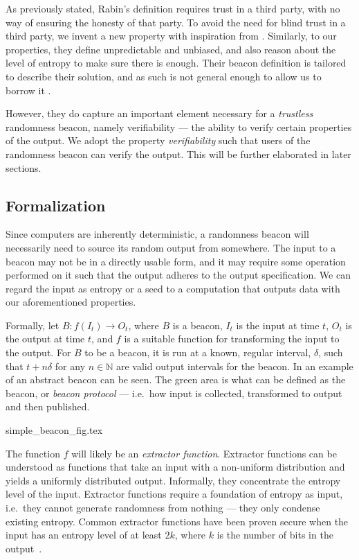 As previously stated, Rabin's definition requires trust in a third party, with no way of ensuring the honesty of that party.
To avoid the need for blind trust in a third party, we invent a new property with inspiration from \citet{bonneau2015bitcoin}.
Similarly, to our properties, they define unpredictable and unbiased, and also reason about the level of entropy to make sure there is enough.
Their beacon definition is tailored to describe their solution, and as such is not general enough to allow us to borrow it%
.

However, they do capture an important element necessary for a \emph{trustless} randomness beacon, namely verifiability --- the ability to verify certain properties of the output.
We adopt the property \emph{verifiability} such that users of the randomness beacon can verify the output. This will be further elaborated in later sections.

\subsection{Formalization}
Since computers are inherently deterministic, a randomness beacon will necessarily need to source its random output from somewhere.
The input to a beacon may not be in a directly usable form, and it may require some operation performed on it such that the output adheres to the output specification.
We can regard the input as entropy or a seed to a computation that outputs data with our aforementioned properties.

Formally, let $B: f(I_t) \rightarrow O_t$, where $B$ is a beacon, $I_t$ is the input at time $t$, $O_t$ is the output at time $t$, and $f$ is a suitable function for transforming the input to the output.
For $B$ to be a beacon, it is run at a known, regular interval, $\delta$, such that $t+n\delta$ for any $n \in \mathbb{N}$ are valid output intervals for the beacon.
In  an example of an abstract beacon can be seen.
The green area is what can be defined as the beacon, or \emph{beacon protocol} --- i.e.\ how input is collected, transformed to output and then published.

{simple_beacon_fig.tex}

The function $f$ will likely be an \emph{extractor function}.
Extractor functions can be understood as functions that take an input with a non-uniform distribution and yields a uniformly distributed output.
Informally, they concentrate the entropy level of the input.
Extractor functions require a foundation of entropy as input, i.e.\ they cannot generate randomness from nothing --- they only condense existing entropy.
Common extractor functions have been proven secure when the input has an entropy level of at least $2k$, where $k$ is the number of bits in the output~\cite{dodis2004randomness}.

